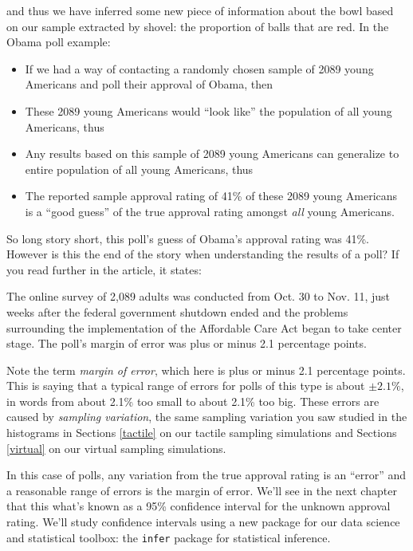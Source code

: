 \documentclass[12pt,]{krantz}
\providecommand{\tightlist}{%
  \setlength{\itemsep}{0pt}\setlength{\parskip}{0pt}}
\renewenvironment{quote}{\begin{VF}}{\end{VF}}
\begin{document}
and thus we have inferred some new piece of information about the bowl
based on our sample extracted by shovel: the proportion of balls that
are red. In the Obama poll example:

\begin{quote}
\begin{itemize}
\tightlist
\item
  If we had a way of contacting a randomly chosen sample of 2089 young
  Americans and poll their approval of Obama, then
\item
  These 2089 young Americans would ``look like'' the population of all
  young Americans, thus
\item
  Any results based on this sample of 2089 young Americans can
  generalize to entire population of all young Americans, thus
\item
  The reported sample approval rating of 41\% of these 2089 young
  Americans is a ``good guess'' of the true approval rating amongst
  \emph{all} young Americans.
\end{itemize}
\end{quote}

So long story short, this poll's guess of Obama's approval rating was
41\%. However is this the end of the story when understanding the
results of a poll? If you read further in the article, it states:

\begin{quote}
The online survey of 2,089 adults was conducted from Oct. 30 to Nov. 11,
just weeks after the federal government shutdown ended and the problems
surrounding the implementation of the Affordable Care Act began to take
center stage. The poll's margin of error was plus or minus 2.1
percentage points.
\end{quote}

Note the term \emph{margin of error}, which here is plus or minus 2.1
percentage points. This is saying that a typical range of errors for
polls of this type is about \(\pm 2.1\%\), in words from about 2.1\% too
small to about 2.1\% too big. These errors are caused by \emph{sampling
variation}, the same sampling variation you saw studied in the
histograms in Sections \ref{tactile} on our tactile sampling simulations
and Sections \ref{virtual} on our virtual sampling simulations.

In this case of polls, any variation from the true approval rating is an
``error'' and a reasonable range of errors is the margin of error. We'll
see in the next chapter that this what's known as a 95\% confidence
interval for the unknown approval rating. We'll study confidence
intervals using a new package for our data science and statistical
toolbox: the \texttt{infer} package for statistical inference.
\end{document}
